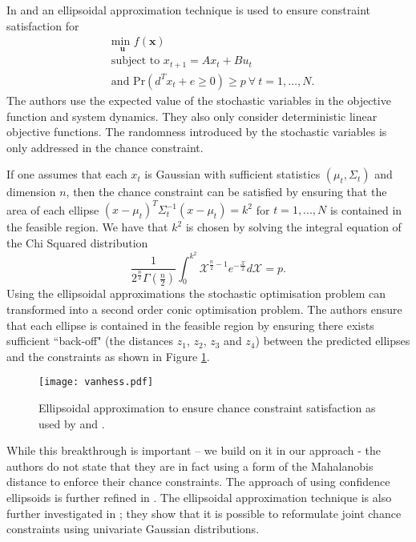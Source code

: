 In \cite{vanhessem2} and \cite{vanhessem1} an ellipsoidal approximation technique is used to ensure constraint satisfaction for  
\begin{equation}
\begin{aligned}
&\underset{\mathbf{u}}{\text{min }} f(\mathbf{x}) \\
& \text{subject to } x_{t+1}=Ax_t+Bu_t \\
& \text{and } \text{Pr}(d^Tx_t + e \geq 0) \geq p ~\forall ~t=1,\hdots,N.
\end{aligned}
\label{eq_lit_chance_mpc_vanhessem}
\end{equation}
The authors use the expected value of the stochastic variables in the objective function and system dynamics. They also only consider deterministic linear objective functions. The randomness introduced by the stochastic variables is only addressed in the chance constraint.

If one assumes that each $x_t$ is Gaussian with sufficient statistics $(\mu_t, \Sigma_t)$ and dimension $n$, then the chance constraint can be satisfied by ensuring that the area of each ellipse $(x-\mu_t)^T\Sigma_t^{-1}(x-\mu_t)=k^2$ for $t=1,...,N$ is contained in the feasible region. We have that $k^2$ is chosen by solving the integral equation of the Chi Squared distribution
\begin{equation}
\frac{1}{2^{\frac{n}{2}}\Gamma(\frac{n}{2})}\int_0^{k^2}\mathcal{X}^{\frac{n}{2}-1}e^{-\frac{\mathcal{X}}{2}}d\mathcal{X} = p.
\label{eq_lit_chi_squared}
\end{equation} 
Using the ellipsoidal approximations the stochastic optimisation problem can transformed into a second order conic optimisation problem. The authors ensure that each ellipse is contained in the feasible region by ensuring there exists sufficient ``back-off" (the distances $z_1$, $z_2$, $z_3$ and $z_4$) between the predicted ellipses and the constraints as shown in Figure \ref{fig_vanhessem}.
\begin{figure}[H]
\centering
\texttt{[image: vanhess.pdf]}
\caption{Ellipsoidal approximation to ensure chance constraint satisfaction as used by \cite{vanhessem2} and \cite{vanhessem1}.}
\label{fig_vanhessem}
\end{figure}
While this breakthrough is important -- we build on it in our approach - the authors do not state that they are in fact using a form of the Mahalanobis distance to enforce their chance constraints. The approach of using confidence ellipsoids is further refined in \cite{cannon}. The ellipsoidal approximation technique is also further investigated in \cite{blackmore2}; they show that it is possible to reformulate joint chance constraints using univariate Gaussian distributions. 

